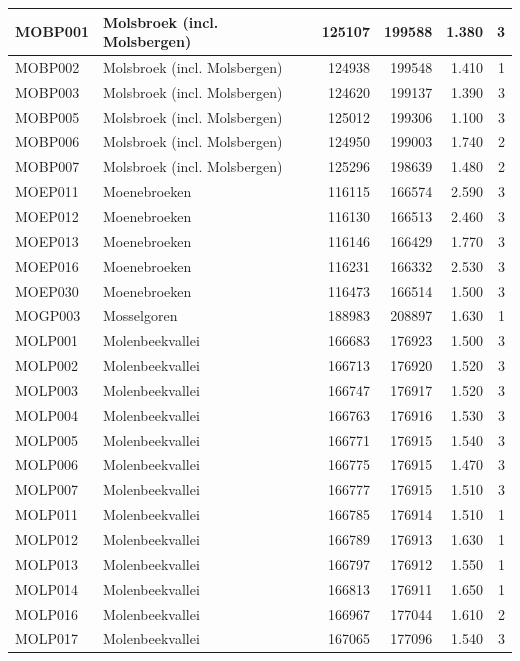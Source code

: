 \documentclass[11pt,]{book}
\begin{document}
\begin{table}
\begin{tabular}[t]{l|l|r|r|r|r}
\hline
MOBP001 & Molsbroek (incl. Molsbergen) & 125107 & 199588 & 1.380 & 3\\
\hline
MOBP002 & Molsbroek (incl. Molsbergen) & 124938 & 199548 & 1.410 & 1\\
\hline
MOBP003 & Molsbroek (incl. Molsbergen) & 124620 & 199137 & 1.390 & 3\\
\hline
MOBP005 & Molsbroek (incl. Molsbergen) & 125012 & 199306 & 1.100 & 3\\
\hline
MOBP006 & Molsbroek (incl. Molsbergen) & 124950 & 199003 & 1.740 & 2\\
\hline
MOBP007 & Molsbroek (incl. Molsbergen) & 125296 & 198639 & 1.480 & 2\\
\hline
MOEP011 & Moenebroeken & 116115 & 166574 & 2.590 & 3\\
\hline
MOEP012 & Moenebroeken & 116130 & 166513 & 2.460 & 3\\
\hline
MOEP013 & Moenebroeken & 116146 & 166429 & 1.770 & 3\\
\hline
MOEP016 & Moenebroeken & 116231 & 166332 & 2.530 & 3\\
\hline
MOEP030 & Moenebroeken & 116473 & 166514 & 1.500 & 3\\
\hline
MOGP003 & Mosselgoren & 188983 & 208897 & 1.630 & 1\\
\hline
MOLP001 & Molenbeekvallei & 166683 & 176923 & 1.500 & 3\\
\hline
MOLP002 & Molenbeekvallei & 166713 & 176920 & 1.520 & 3\\
\hline
MOLP003 & Molenbeekvallei & 166747 & 176917 & 1.520 & 3\\
\hline
MOLP004 & Molenbeekvallei & 166763 & 176916 & 1.530 & 3\\
\hline
MOLP005 & Molenbeekvallei & 166771 & 176915 & 1.540 & 3\\
\hline
MOLP006 & Molenbeekvallei & 166775 & 176915 & 1.470 & 3\\
\hline
MOLP007 & Molenbeekvallei & 166777 & 176915 & 1.510 & 3\\
\hline
MOLP011 & Molenbeekvallei & 166785 & 176914 & 1.510 & 1\\
\hline
MOLP012 & Molenbeekvallei & 166789 & 176913 & 1.630 & 1\\
\hline
MOLP013 & Molenbeekvallei & 166797 & 176912 & 1.550 & 1\\
\hline
MOLP014 & Molenbeekvallei & 166813 & 176911 & 1.650 & 1\\
\hline
MOLP016 & Molenbeekvallei & 166967 & 177044 & 1.610 & 2\\
\hline
MOLP017 & Molenbeekvallei & 167065 & 177096 & 1.540 & 3\\

\end{tabular}
\end{table}
\end{document}
